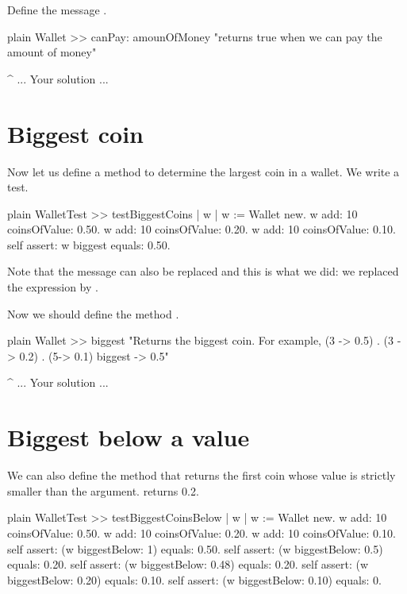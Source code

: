 \documentclass[10pt,twoside,english]{_support/latex/sbabook/sbabook}
\begin{document}
Define the message .

\begin{displaycode}{plain}
Wallet >> canPay: amounOfMoney
	"returns true when we can pay the amount of money"
	
	^ ... Your solution ...
\end{displaycode}
\section{Biggest coin}
Now let us define a method to determine the largest coin in a wallet. We write a test. 

\begin{displaycode}{plain}
WalletTest >> testBiggestCoins
	| w |
	w := Wallet new.
	w add: 10 coinsOfValue: 0.50.
	w add: 10 coinsOfValue: 0.20.
	w add: 10 coinsOfValue: 0.10.
	self assert: w biggest equals: 0.50.
\end{displaycode}

Note that the  message can also be replaced  and this is what we did: we replaced the expression  by .

Now we should define the method .

\begin{displaycode}{plain}
Wallet >> biggest
	"Returns the biggest coin. For example, {(3 -> 0.5) . (3 -> 0.2) . (5-> 0.1)} biggest -> 0.5"

	^ ... Your solution ...
\end{displaycode}
\section{Biggest below a value}
We can also define the method  that returns the first coin whose value is strictly smaller than the argument.  returns 0.2.
	

\begin{displaycode}{plain}
WalletTest >> testBiggestCoinsBelow
	| w |
	w := Wallet new.
	w add: 10 coinsOfValue: 0.50.
	w add: 10 coinsOfValue: 0.20.
	w add: 10 coinsOfValue: 0.10.
	self assert: (w biggestBelow: 1) equals: 0.50.
	self assert: (w biggestBelow: 0.5) equals: 0.20.
	self assert: (w biggestBelow: 0.48) equals: 0.20.
	self assert: (w biggestBelow: 0.20) equals: 0.10.
	self assert: (w biggestBelow: 0.10) equals: 0.
\end{displaycode}
\end{document}
